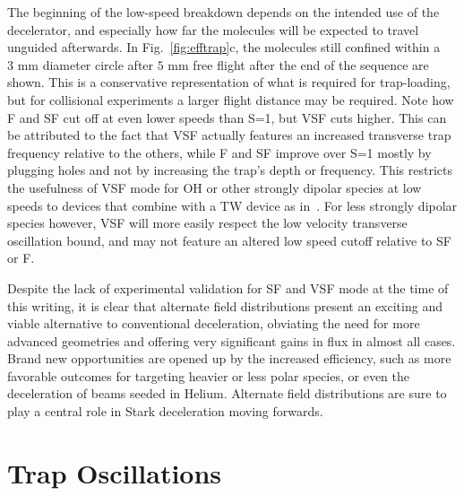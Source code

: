 The beginning of the low-speed breakdown depends on the intended use of the decelerator, and especially how far the molecules will be expected to travel unguided afterwards. 
In Fig.~\ref{fig:efftrap}c, the molecules still confined within a $3\text{ mm}$ diameter circle after $5\text{ mm}$ free flight after the end of the sequence are shown. 
This is a conservative representation of what is required for trap-loading, but for collisional experiments a larger flight distance may be required.
Note how F and SF cut off at even lower speeds than S=1, but VSF cuts higher. 
This can be attributed to the fact that VSF actually features an increased transverse trap frequency relative to the others, while F and SF improve over S=1 mostly by plugging holes and not by increasing the trap's depth or frequency.
This restricts the usefulness of VSF mode for OH or other strongly dipolar species at low speeds to devices that combine with a TW device as in~\cite{Quintero-Perez2013}.
For less strongly dipolar species however, VSF will more easily respect the low velocity transverse oscillation bound, and may not feature an altered low speed cutoff relative to SF or F.

Despite the lack of experimental validation for SF and VSF mode at the time of this writing, it is clear that alternate field distributions present an exciting and viable alternative to conventional deceleration, obviating the need for more advanced geometries and offering very significant gains in flux in almost all cases.
Brand new opportunities are opened up by the increased efficiency, such as more favorable outcomes for targeting heavier or less polar species, or even the deceleration of beams seeded in Helium.
Alternate field distributions are sure to play a central role in Stark deceleration moving forwards.

\section{Trap Oscillations}

